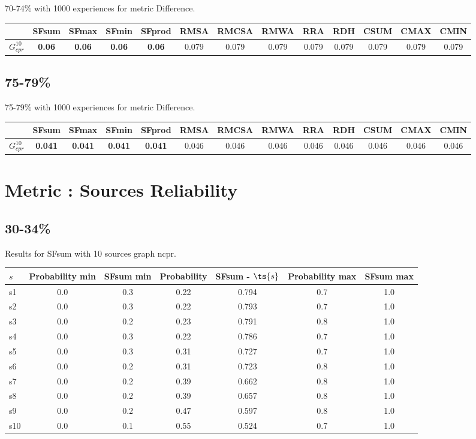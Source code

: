 \documentclass{article}
\newcommand{\graph}[2]{$G_{#1}^{#2}$}
\begin{document}
70-74\% with 1000 experiences for metric Difference.

\noindent\begin{tabular}{|l|c|c|c|c|c|c|c|c|c|c|c|c|}
\hline
& SFsum& SFmax& SFmin& SFprod& RMSA& RMCSA& RMWA& RRA& RDH& CSUM& CMAX& CMIN\\
\hline
\graph{cpr}{10} &\textbf{0.06}&\textbf{0.06}&\textbf{0.06}&\textbf{0.06}&0.079&0.079&0.079&0.079&0.079&0.079&0.079&0.079\\
\hline
\end{tabular}
\newpage

\subsection{75-79\%}

75-79\% with 1000 experiences for metric Difference.

\noindent\begin{tabular}{|l|c|c|c|c|c|c|c|c|c|c|c|c|}
\hline
& SFsum& SFmax& SFmin& SFprod& RMSA& RMCSA& RMWA& RRA& RDH& CSUM& CMAX& CMIN\\
\hline
\graph{cpr}{10} &\textbf{0.041}&\textbf{0.041}&\textbf{0.041}&\textbf{0.041}&0.046&0.046&0.046&0.046&0.046&0.046&0.046&0.046\\
\hline
\end{tabular}
\newpage
\newpage
\section{Metric : Sources Reliability}

\newpage
\newpage

\subsection{30-34\%}

\noindent Results for SFsum with 10 sources graph ncpr.

\noindent\begin{tabular}{|l|c|c|c|c|c|c|}
\hline
$s$& Probability min & SFsum min & Probability & SFsum - $\ts{s}$ & Probability max & SFsum max\\
\hline
s1 &0.0 & 0.3 & 0.22 & 0.794 & 0.7 & 1.0\\
\hline
s2 &0.0 & 0.3 & 0.22 & 0.793 & 0.7 & 1.0\\
\hline
s3 &0.0 & 0.2 & 0.23 & 0.791 & 0.8 & 1.0\\
\hline
s4 &0.0 & 0.3 & 0.22 & 0.786 & 0.7 & 1.0\\
\hline
s5 &0.0 & 0.3 & 0.31 & 0.727 & 0.7 & 1.0\\
\hline
s6 &0.0 & 0.2 & 0.31 & 0.723 & 0.8 & 1.0\\
\hline
s7 &0.0 & 0.2 & 0.39 & 0.662 & 0.8 & 1.0\\
\hline
s8 &0.0 & 0.2 & 0.39 & 0.657 & 0.8 & 1.0\\
\hline
s9 &0.0 & 0.2 & 0.47 & 0.597 & 0.8 & 1.0\\
\hline
s10 &0.0 & 0.1 & 0.55 & 0.524 & 0.7 & 1.0\\
\hline
\end{tabular}\\
\end{document}
